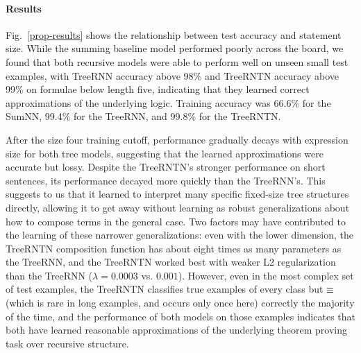\paragraph{Results} Fig.~\ref{prop-results} shows the relationship
between test accuracy and statement size. While the summing baseline model performed poorly across the board, we found that both recursive
models were able to perform well on unseen small test examples, 
with TreeRNN accuracy above
98\% and TreeRNTN accuracy above 99\% on formulae below length five, indicating
that they learned correct approximations of the underlying
logic. Training accuracy was 66.6\% for the SumNN, 99.4\% for the TreeRNN, and 99.8\% for the TreeRNTN.

After the size four training cutoff, performance gradually decays with expression size for both tree models, suggesting that the learned approximations were accurate but lossy.
Despite the TreeRNTN's stronger performance on short sentences, its performance
decayed more quickly than the TreeRNN's. 
This suggests to us that it learned to interpret many specific fixed-size tree structures directly,
allowing it to get away without learning as robust generalizations about how to compose
terms in the general case.
Two factors may have contributed to the learning of these narrower generalizations: 
even with the lower dimension,
the TreeRNTN composition function has about eight times as many parameters as the
TreeRNN, and the TreeRNTN worked best with weaker L2 regularization than the 
TreeRNN ($\lambda = 0.0003$ vs. $0.001$). 
However, even in the most complex set of test examples, the TreeRNTN classifies true examples of every
 class but $\equiv$ (which is rare in long examples, and occurs only once here) correctly 
the majority of the time, and
 the performance of both models on those examples indicates that both have learned
  reasonable approximations of the underlying theorem proving task over recursive structure.

























